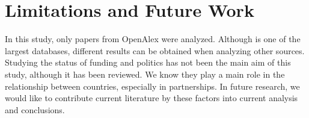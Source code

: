 \section{Limitations and Future Work}
\label{sec:limitations}

In this study, only papers from OpenAlex were analyzed. Although is one of the largest databases, different results can be obtained when analyzing other sources.
Studying the status of funding and politics has not been the main aim of this study, although it has been reviewed. We know they play a main role in the relationship between countries, especially in partnerships. In future research, we would like to contribute current literature by these factors into current analysis and conclusions. 

\blankpage
